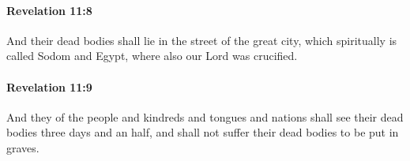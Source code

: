 		\paragraph{Revelation 11:8} %
			\label{REVELATIONNT-11-8}

			And their dead bodies shall lie in the street of the great city, which spiritually is called Sodom and Egypt, where also our Lord was crucified.

			\begin{framed}
			\scriptsize
				\begin{compactdesc}
					\item[SBLG] 
				\end{compactdesc}
			\end{framed}

		\paragraph{Revelation 11:9} %
			\label{REVELATIONNT-11-9}

			And they of the people and kindreds and tongues and nations shall see their dead bodies three days and an half, and shall not suffer their dead bodies to be put in graves.

